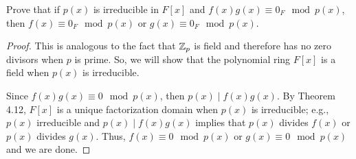 \documentclass[../hw6]{subfiles}
\begin{document}
\begin{problem}
Prove that if $p(x)$ is irreducible in  $F[x]$ and $f(x)g(x)\equiv 0_F\mod{p(x)}$,
then $f(x)\equiv 0_F\mod{p(x)} $ or $g(x)\equiv 0_F \mod{p(x)} $.
\end{problem}
\begin{proof}
	This is analogous to the fact that $\mathbb{Z}_p$ is field and therefore has no zero divisors when $p$ is prime.
	So, we will show that the polynomial ring $F[x]$ is a field when  $p(x)$ is irreducible.

	Since $f(x)g(x) \equiv 0 \mod{p(x)} $, then $p(x)\mid f(x)g(x)$.
	By Theorem 4.12, $F[x]$ is a unique factorization domain when  $p(x)$ is irreducible; e.g., $p(x)$ irreducible and $p(x)\mid f(x)g(x) $ implies that $p(x)$ divides  $f(x)$ or $p(x)$ divides  $g(x)$.
	Thus, $f(x)\equiv 0 \mod{p(x)} $ or $g(x)\equiv 0 \mod{p(x)} $ and we are done.
\end{proof}
\end{document}
